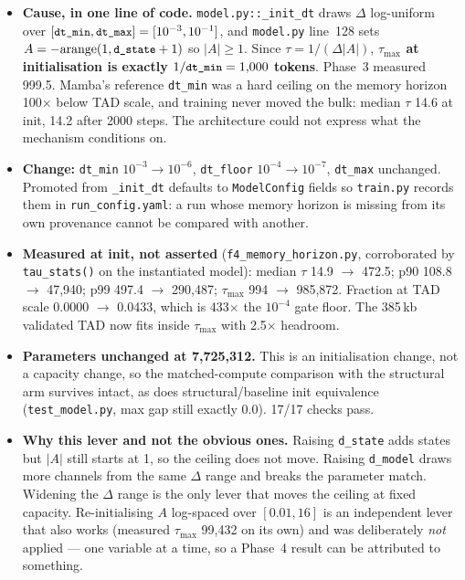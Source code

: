 \documentclass[11pt,a4paper]{article}
\newcommand{\code}[1]{\texttt{\small #1}}
\begin{document}
\begin{itemize}
\item \textbf{Cause, in one line of code.} \code{model.py::\_init\_dt} draws
$\Delta$ log-uniform over $[\code{dt\_min}, \code{dt\_max}] = [10^{-3},
10^{-1}]$, and \code{model.py} line~128 sets $A = -\mathrm{arange}(1,
\code{d\_state}+1)$ so $|A| \ge 1$. Since $\tau = 1/(\Delta|A|)$,
\textbf{$\tau_{\max}$ at initialisation is exactly $1/\code{dt\_min} = 1{,}000$
tokens}. Phase~3 measured 999.5. Mamba's reference \code{dt\_min} was a hard
ceiling on the memory horizon 100$\times$ below TAD scale, and training never
moved the bulk: median $\tau$ 14.6 at init, 14.2 after 2000 steps. The
architecture could not express what the mechanism conditions on.
\item \textbf{Change:} \code{dt\_min} $10^{-3} \rightarrow 10^{-6}$,
\code{dt\_floor} $10^{-4} \rightarrow 10^{-7}$, \code{dt\_max} unchanged.
Promoted from \code{\_init\_dt} defaults to \code{ModelConfig} fields so
\code{train.py} records them in \code{run\_config.yaml}: a run whose memory
horizon is missing from its own provenance cannot be compared with another.
\item \textbf{Measured at init, not asserted} (\code{f4\_memory\_horizon.py},
corroborated by \code{tau\_stats()} on the instantiated model): median $\tau$
14.9 $\rightarrow$ 472.5; p90 108.8 $\rightarrow$ 47{,}940; p99 497.4
$\rightarrow$ 290{,}487; $\tau_{\max}$ 994 $\rightarrow$ 985{,}872. Fraction at
TAD scale 0.0000 $\rightarrow$ 0.0433, which is 433$\times$ the $10^{-4}$ gate
floor. The 385\,kb validated TAD now fits inside $\tau_{\max}$ with 2.5$\times$
headroom.
\item \textbf{Parameters unchanged at 7{,}725{,}312.} This is an initialisation
change, not a capacity change, so the matched-compute comparison with the
structural arm survives intact, as does structural/baseline init equivalence
(\code{test\_model.py}, max gap still exactly 0.0). 17/17 checks pass.
\item \textbf{Why this lever and not the obvious ones.} Raising
\code{d\_state} adds states but $|A|$ still starts at 1, so the ceiling does not
move. Raising \code{d\_model} draws more channels from the same $\Delta$ range
and breaks the parameter match. Widening the $\Delta$ range is the only lever
that moves the ceiling at fixed capacity. Re-initialising $A$ log-spaced over
$[0.01, 16]$ is an independent lever that also works (measured $\tau_{\max}$
99{,}432 on its own) and was deliberately \emph{not} applied --- one variable at
a time, so a Phase~4 result can be attributed to something.

\end{itemize}
\end{document}
